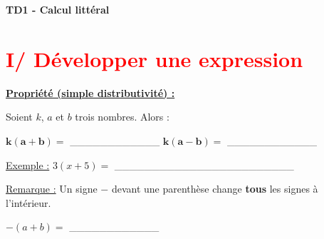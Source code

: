 \documentclass[12pt]{article}
\begin{document}

\begin{center}
    {\LARGE \textbf{TD1 - Calcul littéral}}\\[4mm]
\end{center}


\section*{\textcolor{red}{I/ Développer une expression}}

\vspace{5pt}
\begin{mdframed}[
    linewidth=1pt,
    roundcorner=5pt,
    linecolor=Red,
    innertopmargin=10pt,
    innerbottommargin=10pt
]
{\color{red}
\textbf{\underline{Propriété (simple distributivité) :}}

\vspace{5pt}
Soient $k$, $a$ et $b$ trois nombres. Alors :

\vspace{10pt}
\begin{center}
    $\bm{k(a+b) = }$ \_\_\_\_\_\_\_\_\_\_\_\_ \hspace{2cm} $\bm{k(a-b) = }$ \_\_\_\_\_\_\_\_\_\_\_\_
\end{center}
}
\end{mdframed}

\vspace{5pt}
\underline{Exemple :} $3(x+5) =$ \_\_\_\_\_\_\_\_\_\_\_\_\_\_\_\_\_\_\_\_\_\_\_\_

\vspace{10pt}
\underline{Remarque :} Un signe $-$ devant une parenthèse change \textbf{tous} les signes à l'intérieur.

\vspace{10pt}
\hspace{1cm}$-(a+b) = $ \_\_\_\_\_\_\_\_\_\_\_\_
\end{document}
